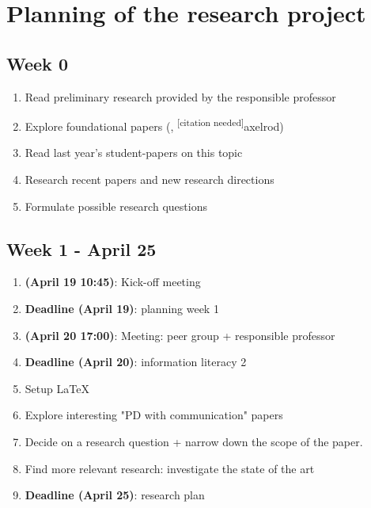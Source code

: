 \documentclass[english]{article}
\newcommand{\citationneeded}{\textsuperscript{\color{blue} [citation needed]}}
\begin{document}
\section*{Planning of the research project}


\subsection*{Week 0}
\begin{enumerate}
\item Read preliminary research provided by the responsible professor
\item Explore foundational papers (\citep{smaldino}, \citationneeded{axelrod})
\item Read last year's student-papers on this topic
\item Research recent papers and new research directions
\item Formulate possible research questions
\end{enumerate}

\subsection*{Week 1 - April 25}
\begin{enumerate}
\item \textbf{(April 19 10:45)}: Kick-off meeting
\item \textbf{Deadline (April 19)}: planning week 1
\item \textbf{(April 20 17:00)}: Meeting: peer group + responsible professor
\item \textbf{Deadline (April 20)}: information literacy 2
\item Setup \LaTeX
\item Explore interesting "PD with communication" papers
\item Decide on a research question + narrow down the scope of the paper.
\item Find more relevant research: investigate the state of the art
\item \textbf{Deadline (April 25)}: research plan
\end{enumerate}
\end{document}
